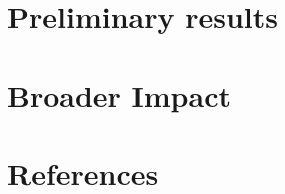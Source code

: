 \documentclass{article}
\begin{document}
\section{Preliminary results}



\section*{Broader Impact}



\section*{References}

{\small


}
\end{document}

